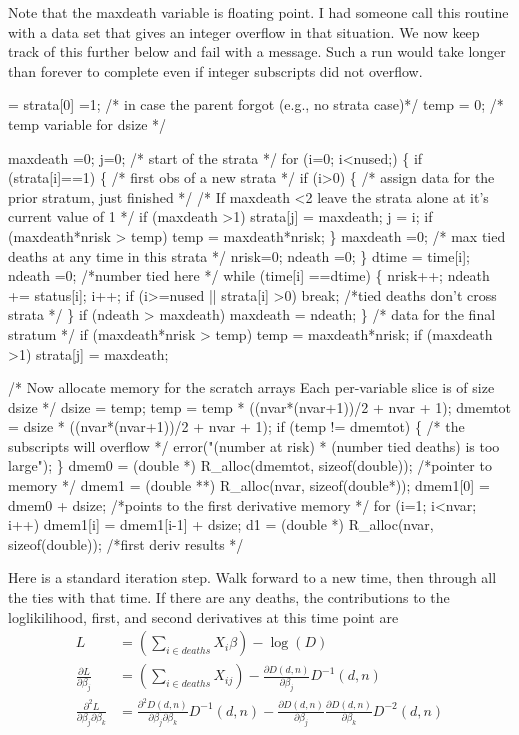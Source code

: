 \documentclass{article}
\begin{document}
Note that the maxdeath variable is floating point. I had someone call this
routine with a data set that gives an integer overflow in that situation.
We now keep track of this further below and fail with a message.  
Such a run would take longer than forever to complete even if integer
subscripts did not overflow.
\begin{nwchunk}
=
 strata[0] =1;  /* in case the parent forgot (e.g., no strata case)*/
 temp = 0;      /* temp variable for dsize */
 
 maxdeath =0;
 j=0;   /* start of the strata */
 for (i=0; i<nused;) \{
     if (strata[i]==1) \{ /* first obs of a new strata */
        if (i>0) \{
            /* assign data for the prior stratum, just finished */
            /* If maxdeath <2 leave the strata alone at it's current value of 1 */
            if (maxdeath >1) strata[j] = maxdeath;
            j = i;
            if (maxdeath*nrisk > temp) temp = maxdeath*nrisk;
        \}
        maxdeath =0;  /* max tied deaths at any time in this strata */
        nrisk=0;
        ndeath =0;
     \}
     dtime = time[i];
     ndeath =0;  /*number tied here */
     while (time[i] ==dtime) \{
         nrisk++;
         ndeath += status[i];
         i++;
         if (i>=nused || strata[i] >0) break;  /*tied deaths don't cross strata */
     \}
     if (ndeath > maxdeath) maxdeath = ndeath;
 \}
 /* data for the final stratum */
 if (maxdeath*nrisk > temp) temp = maxdeath*nrisk;
 if (maxdeath >1) strata[j] = maxdeath;
 
 /* Now allocate memory for the scratch arrays 
    Each per-variable slice is of size dsize 
 */
 dsize = temp;
 temp    = temp * ((nvar*(nvar+1))/2 + nvar + 1);
 dmemtot = dsize * ((nvar*(nvar+1))/2 + nvar + 1);
 if (temp != dmemtot) \{ /* the subscripts will overflow */
     error("(number at risk) * (number tied deaths) is too large");
 \}
 dmem0 = (double *) R_alloc(dmemtot, sizeof(double)); /*pointer to memory */
 dmem1 = (double **) R_alloc(nvar, sizeof(double*));
 dmem1[0] = dmem0 + dsize; /*points to the first derivative memory */
 for (i=1; i<nvar; i++) dmem1[i] = dmem1[i-1] + dsize;
 d1 = (double *) R_alloc(nvar, sizeof(double)); /*first deriv results */
\end{nwchunk}

Here is a standard iteration step. Walk forward to a new time,
then through all the ties with that time. 
If there are any deaths, the contributions to the loglikilihood,
first, and second derivatives at this time point are
\begin{align}
  L &= \left(\sum_{i \in deaths} X_i\beta\right) - \log(D) \\
  \frac{\partial L}{\partial \beta_j} &= \left(\sum_{i \in deaths} X_{ij} \right) -
   \frac{\partial D(d,n)}{\partial \beta_j} D^{-1}(d,n) \\
   \frac{\partial^2 L }{\partial \beta_j \partial \beta_k} &=
     \frac{\partial^2 D(d,n) }{\partial \beta_j \partial \beta_k} D^{-1}(d,n) -
     \frac{\partial D(d,n)}{\partial \beta_j}
     \frac{\partial D(d,n)}{\partial \beta_k} D^{-2}(d,n)
\end{align}
\end{document}
